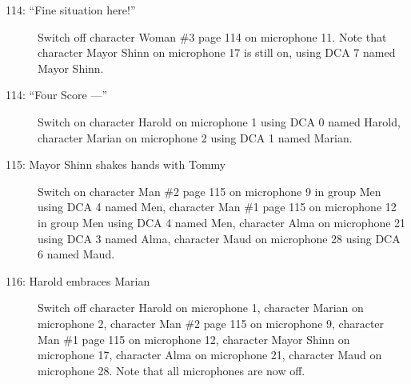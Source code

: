 \begin{description}
\item[114: ``Fine situation here!'']
Switch off character Woman \#3 page 114 on microphone 11. Note that character Mayor Shinn on microphone 17 is still on, using DCA 7 named Mayor Shinn.

\item[114: ``Four Score ---'']
Switch on character Harold on microphone 1 using DCA 0 named Harold, character Marian on microphone 2 using DCA 1 named Marian. 

\item[115: Mayor Shinn shakes hands with Tommy]
Switch on character Man \#2 page 115 on microphone 9 in group Men using DCA 4 named Men, character Man \#1 page 115 on microphone 12 in group Men using DCA 4 named Men, character Alma on microphone 21 using DCA 3 named Alma, character Maud on microphone 28 using DCA 6 named Maud. 

\item[116: Harold embraces Marian]
Switch off character Harold on microphone 1, character Marian on microphone 2, character Man \#2 page 115 on microphone 9, character Man \#1 page 115 on microphone 12, character Mayor Shinn on microphone 17, character Alma on microphone 21, character Maud on microphone 28. Note that all microphones are now off.

\end{description}
